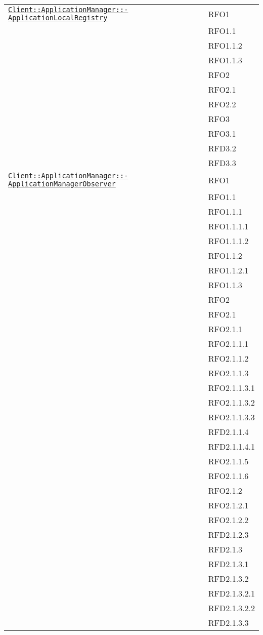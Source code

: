 \begin{longtable}{|>{\centering}m{10cm}|m{3cm}<{\centering}|}
\hyperref[Client::ApplicationManager::ApplicationLocalRegistry]{\texttt{Client::ApplicationManager::-\linebreak ApplicationLocalRegistry}} & RFO1\\
& RFO1.1\\
& RFO1.1.2\\
& RFO1.1.3\\
& RFO2\\
& RFO2.1\\
& RFO2.2\\
& RFO3\\
& RFO3.1\\
& RFD3.2\\
& RFD3.3\\ \hline

\hyperref[Client::ApplicationManager::ApplicationManagerObserver]{\texttt{Client::ApplicationManager::-\linebreak ApplicationManagerObserver}} & RFO1\\
& RFO1.1\\
& RFO1.1.1\\
& RFO1.1.1.1\\
& RFO1.1.1.2\\
& RFO1.1.2\\
& RFO1.1.2.1\\
& RFO1.1.3\\
& RFO2\\
& RFO2.1\\
& RFO2.1.1\\
& RFO2.1.1.1\\
& RFO2.1.1.2\\
& RFO2.1.1.3\\
& RFO2.1.1.3.1\\
& RFO2.1.1.3.2\\
& RFO2.1.1.3.3\\
& RFD2.1.1.4\\
& RFD2.1.1.4.1\\
& RFO2.1.1.5\\
& RFO2.1.1.6\\
& RFO2.1.2\\
& RFO2.1.2.1\\
& RFO2.1.2.2\\
& RFD2.1.2.3\\
& RFD2.1.3\\
& RFD2.1.3.1\\
& RFD2.1.3.2\\
& RFD2.1.3.2.1\\
& RFD2.1.3.2.2\\
& RFD2.1.3.3\\

\end{longtable}
